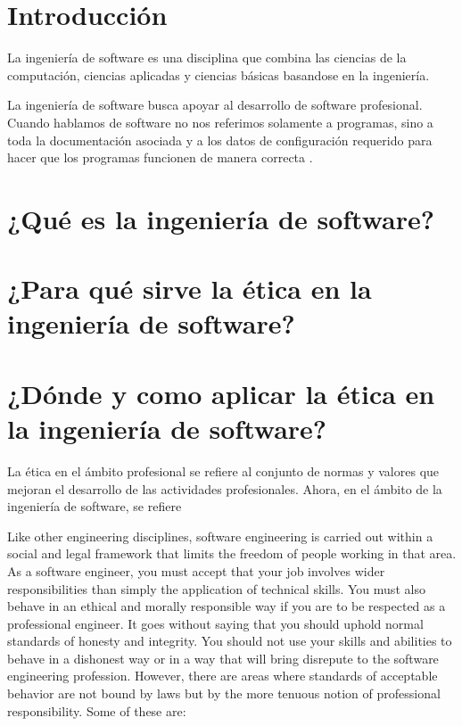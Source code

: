 \documentclass[twoside]{article}
\begin{document}
\begin{multicols}{2} %

\section{Introducción}

La ingeniería de software es una disciplina que combina las ciencias de la
computación, ciencias aplicadas y ciencias básicas basandose en la ingeniería.

La ingeniería de software busca apoyar al desarrollo de software profesional.
Cuando hablamos de software no nos referimos solamente a programas, sino a toda
la documentación  asociada y a los datos de configuración requerido para hacer
que los programas funcionen de manera correcta \cite{sommerville2005ingenieria}.


\section{¿Qué es la ingeniería de software?}


\section{¿Para qué sirve la ética en la ingeniería de software?}


\section{¿Dónde y como aplicar la ética en la ingeniería de software?}




La ética en el ámbito profesional se refiere al conjunto de normas y valores que
mejoran el desarrollo de las actividades profesionales. Ahora, en el ámbito de
la ingeniería de software, se refiere 

Like other engineering disciplines, software engineering is carried out within a
social and legal framework that limits the freedom of people working in that
area. As a software engineer, you must accept that your job involves wider
responsibilities than simply the application of technical skills. You must also
behave in an ethical and morally responsible way if you are to be respected as a
professional engineer. It goes without saying that you should uphold normal
standards of honesty and integrity. You should not use your skills and abilities
to behave in a dishonest way or in a way that will bring disrepute to the
software engineering profession. However, there are areas where standards of
acceptable behavior are not bound by laws but by the more tenuous notion of
professional responsibility. Some of these are:


\end{multicols}
\end{document}
